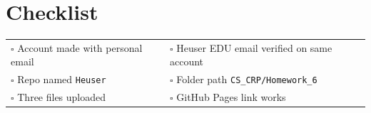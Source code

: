 \documentclass[11pt]{article}
\begin{document}
\section*{Checklist}
\begin{tabular}{@{}ll@{}}
$\square$ Account made with personal email & $\square$ Heuser EDU email verified on same account\\
$\square$ Repo named \texttt{Heuser} & $\square$ Folder path \texttt{CS\_CRP/Homework\_6}\\
$\square$ Three files uploaded & $\square$ GitHub Pages link works\\
\end{tabular}
\end{document}
